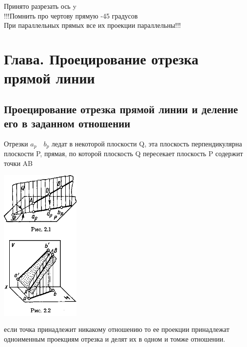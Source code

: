 \documentclass[a4paper, 12pt]{article}
\begin{document}
Принято разрезать ось y\\

!!!Помнить про чертову прямую -45 градусов\\
При параллельных прямых все их проекции параллельны!!!\\

\section{Глава. Проецирование отрезка прямой линии}
\subsection{Проецирование отрезка прямой линии и деление его в заданном отношении}

Отрезки $a_p \quad b_p$ ледат в некоторой плоскости Q, эта плоскость перпендикулярна плоскости P, прямая, по которой плоскость Q пересекает плоскость P содержит точки AB\\
\begin{center}
	\includegraphics{img/211.png}
\end{center}


если точка принадлежит никакому отношению то ее проекции принадлежат одноименным проекциям отрезка и делят их в одном и томже отношении.
\\
\end{document}
